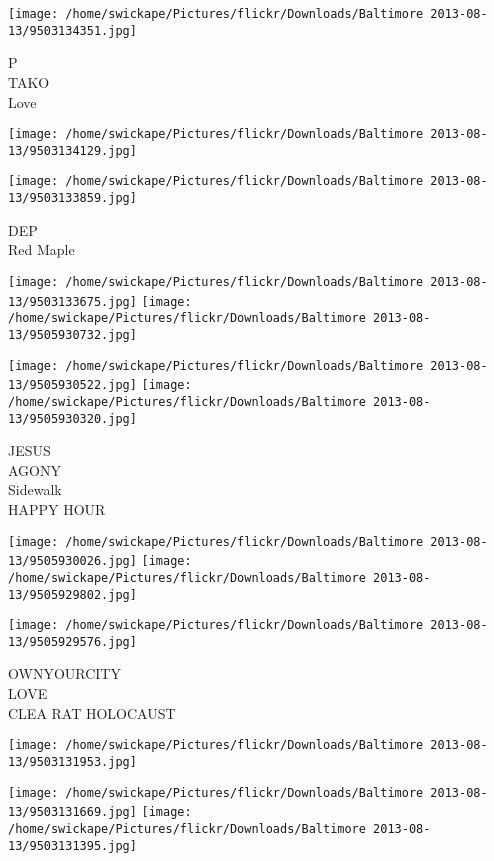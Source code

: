 \documentclass[10pt,letterpaper]{article}
\begin{document}
\vspace{0.25in}
\texttt{[image: /home/swickape/Pictures/flickr/Downloads/Baltimore 2013-08-13/9503134351.jpg]}

P\\
TAKO\\
Love\\
\pagebreak

\texttt{[image: /home/swickape/Pictures/flickr/Downloads/Baltimore 2013-08-13/9503134129.jpg]}

\vspace{0.25in}
\texttt{[image: /home/swickape/Pictures/flickr/Downloads/Baltimore 2013-08-13/9503133859.jpg]}

DEP\\
Red Maple\\
\pagebreak

\texttt{[image: /home/swickape/Pictures/flickr/Downloads/Baltimore 2013-08-13/9503133675.jpg]}
\texttt{[image: /home/swickape/Pictures/flickr/Downloads/Baltimore 2013-08-13/9505930732.jpg]}

\texttt{[image: /home/swickape/Pictures/flickr/Downloads/Baltimore 2013-08-13/9505930522.jpg]}
\texttt{[image: /home/swickape/Pictures/flickr/Downloads/Baltimore 2013-08-13/9505930320.jpg]}

JESUS\\
AGONY\\
Sidewalk\\
HAPPY HOUR\\
\pagebreak

\texttt{[image: /home/swickape/Pictures/flickr/Downloads/Baltimore 2013-08-13/9505930026.jpg]}
\texttt{[image: /home/swickape/Pictures/flickr/Downloads/Baltimore 2013-08-13/9505929802.jpg]}

\texttt{[image: /home/swickape/Pictures/flickr/Downloads/Baltimore 2013-08-13/9505929576.jpg]}

OWNYOURCITY\\
LOVE\\
CLEA RAT HOLOCAUST\\
\pagebreak

\texttt{[image: /home/swickape/Pictures/flickr/Downloads/Baltimore 2013-08-13/9503131953.jpg]}

\vspace{0.25in}
\texttt{[image: /home/swickape/Pictures/flickr/Downloads/Baltimore 2013-08-13/9503131669.jpg]}
\texttt{[image: /home/swickape/Pictures/flickr/Downloads/Baltimore 2013-08-13/9503131395.jpg]}
\end{document}
